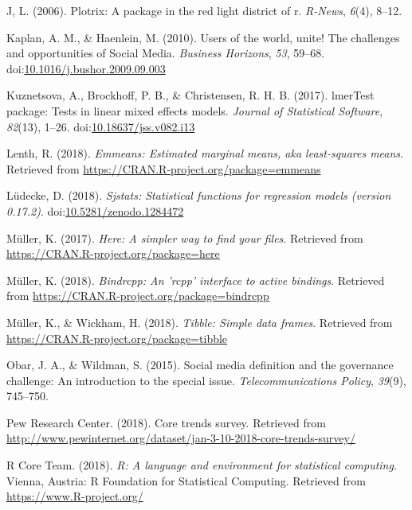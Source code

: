 \documentclass[man, fleqn, noextraspace]{apa6}
\theoremstyle{definition}
\theoremstyle{definition}
\theoremstyle{definition}
\theoremstyle{remark}
\begin{document}
\hypertarget{ref-R-plotrix}{}
J, L. (2006). Plotrix: A package in the red light district of r.
\emph{R-News}, \emph{6}(4), 8--12.

\hypertarget{ref-Kaplan2010}{}
Kaplan, A. M., \& Haenlein, M. (2010). Users of the world, unite! The
challenges and opportunities of Social Media. \emph{Business Horizons},
\emph{53}, 59--68.
doi:\href{https://doi.org/10.1016/j.bushor.2009.09.003}{10.1016/j.bushor.2009.09.003}

\hypertarget{ref-R-lmerTest}{}
Kuznetsova, A., Brockhoff, P. B., \& Christensen, R. H. B. (2017).
lmerTest package: Tests in linear mixed effects models. \emph{Journal of
Statistical Software}, \emph{82}(13), 1--26.
doi:\href{https://doi.org/10.18637/jss.v082.i13}{10.18637/jss.v082.i13}

\hypertarget{ref-R-emmeans}{}
Lenth, R. (2018). \emph{Emmeans: Estimated marginal means, aka
least-squares means}. Retrieved from
\url{https://CRAN.R-project.org/package=emmeans}

\hypertarget{ref-R-sjstats}{}
Lüdecke, D. (2018). \emph{Sjstats: Statistical functions for regression
models (version 0.17.2)}.
doi:\href{https://doi.org/10.5281/zenodo.1284472}{10.5281/zenodo.1284472}

\hypertarget{ref-R-here}{}
Müller, K. (2017). \emph{Here: A simpler way to find your files}.
Retrieved from \url{https://CRAN.R-project.org/package=here}

\hypertarget{ref-R-bindrcpp}{}
Müller, K. (2018). \emph{Bindrcpp: An 'rcpp' interface to active
bindings}. Retrieved from
\url{https://CRAN.R-project.org/package=bindrcpp}

\hypertarget{ref-R-tibble}{}
Müller, K., \& Wickham, H. (2018). \emph{Tibble: Simple data frames}.
Retrieved from \url{https://CRAN.R-project.org/package=tibble}

\hypertarget{ref-Obar2015}{}
Obar, J. A., \& Wildman, S. (2015). Social media definition and the
governance challenge: An introduction to the special issue.
\emph{Telecommunications Policy}, \emph{39}(9), 745--750.

\hypertarget{ref-Pew}{}
Pew Research Center. (2018). Core trends survey. Retrieved from
\url{http://www.pewinternet.org/dataset/jan-3-10-2018-core-trends-survey/}

\hypertarget{ref-R-base}{}
R Core Team. (2018). \emph{R: A language and environment for statistical
computing}. Vienna, Austria: R Foundation for Statistical Computing.
Retrieved from \url{https://www.R-project.org/}
\end{document}
